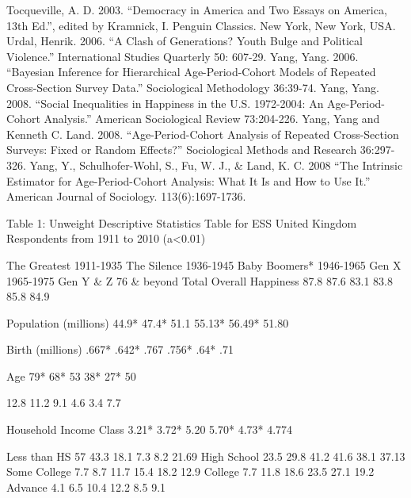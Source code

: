 Tocqueville, A. D. 2003. “Democracy in America and Two Essays on America, 13th Ed.”, edited by Kramnick, I. Penguin Classics. New York, New York, USA.
Urdal, Henrik. 2006. “A Clash of Generations? Youth Bulge and Political Violence.” International Studies Quarterly 50: 607-29.
Yang, Yang. 2006. “Bayesian Inference for Hierarchical Age-Period-Cohort Models of Repeated Cross-Section Survey Data.” Sociological Methodology 36:39-74.
Yang, Yang. 2008. “Social Inequalities in Happiness in the U.S. 1972-2004: An Age-Period-Cohort Analysis.” American Sociological Review 73:204-226.
Yang, Yang and Kenneth C. Land. 2008. “Age-Period-Cohort Analysis of Repeated Cross-Section Surveys: Fixed or Random Effects?” Sociological Methods and Research 36:297-326.
Yang, Y., Schulhofer-Wohl, S., Fu, W. J., & Land, K. C. 2008 “The Intrinsic Estimator for Age-Period-Cohort Analysis: What It Is and How to Use It.” American Journal of Sociology. 113(6):1697-1736.

Table 1: Unweight Descriptive Statistics Table for ESS United Kingdom Respondents from 1911 to 2010 (a<0.01)

The Greatest
1911-1935
The Silence
1936-1945
Baby Boomers*
1946-1965
Gen X
1965-1975
Gen Y & Z
76 & beyond
Total
Overall Happiness
87.8%
87.6%
83.1%
83.8%
85.8%
84.9%







Population (millions)
44.9*
47.4*
51.1
55.13*
56.49*
51.80







Birth (millions)
.667*
.642*
.767
.756*
.64*
.71







Age
79*
68*
53
38*
27*
50







12.8%
11.2%
9.1%
4.6%
3.4%
7.7%







Household Income Class
3.21*
3.72*
5.20
5.70*
4.73*
4.774







Less than HS
57%
43.3%
18.1%
7.3%
8.2%
21.69%
High School
23.5%
29.8%
41.2%
41.6%
38.1%
37.13%
Some College
7.7%
8.7%
11.7%
15.4%
18.2%
12.9%
College
7.7%
11.8%
18.6%
23.5%
27.1%
19.2%
Advance
4.1%
6.5%
10.4%
12.2%
8.5%
9.1%







